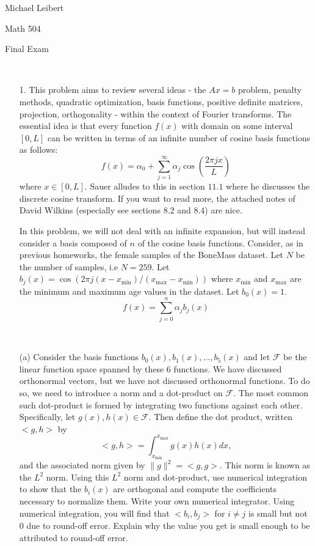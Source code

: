 \documentclass[]{article}
\title{}
\author{}
\date{}
\begin{document}
Michael Leibert

Math 504

Final Exam

~

\begin{itemize}
\item[1.] This problem aims to review several ideas - the $Ax=b$ problem, penalty methods, quadratic optimization, basis functions, positive definite matrices, projection, orthogonality - within the context of Fourier transforms.   The essential idea is that every function $f(x)$ with domain on some interval $[0,L]$ can be written in terms of an infinite number of cosine basis functions as follows:
\begin{equation*}
f(x) = \alpha_0 + \sum_{j=1}^\infty \alpha_j \cos\left(\frac{2 \pi j x}{L}\right)
\end{equation*}
where $x \in [0,L]$.   Sauer alludes to this in section $11.1$ where he discusses the discrete cosine transform.   If you want to read more, the attached notes of David Wilkins (especially see sections $8.2$ and $8.4$)  are nice.
\ 


In this problem, we will not deal with an infinite expansion, but will instead consider a basis composed of $n$ of the cosine basis functions.  Consider, as in previous homeworks, the female samples of the BoneMass dataset.  Let $N$ be the number of samples, i.e $N=259$.   Let $b_j(x) = \cos\left(2 \pi j (x - x_\text{min})/(x_\text{max} - x_\text{min})\right)$ where $x_\text{min}$ and $x_\text{max}$ are the minimum and maximum age values in the dataset.  Let $b_0(x) = 1$.  
\begin{equation*}
f(x) = \sum_{j=0}^n \alpha_j b_j(x)
\end{equation*}
\end{itemize}

~

\begin{itemize}
\item[(a)] Consider the basis functions $b_0(x), b_1(x), \dots, b_5(x)$ and let $\mathcal{F}$ be the linear function space spanned by these $6$ functions.  We have discussed orthonormal vectors, but we have not discussed orthonormal functions.   To do so, we need to introduce a norm and a dot-product on $\mathcal{F}$. The most common such dot-product is formed by integrating two functions against each other.   Specifically, let $g(x), h(x) \in \mathcal{F}$.  Then define the dot product, written $<g, h>$ by
\begin{equation*}
<g, h> = \int_{x_{\text{min}}}^{x_{\text{max}}} g(x) h(x) dx,
\end{equation*}
and the associated norm given by $\|g\|^2 = <g,g>$.  This norm is known as the $L^2$ norm.  Using this $L^2$ norm and dot-product, use numerical integration to show that the $b_i(x)$ are orthogonal and compute the coefficients necessary to normalize them.  Write your own numerical integrator.  Using numerical integration, you will find that $<b_i, b_j>$ for $i \ne j$ is small but not $0$ due to round-off error.  Explain why the value you get is small enough to be attributed to round-off error.  
\end{itemize}
\end{document}
